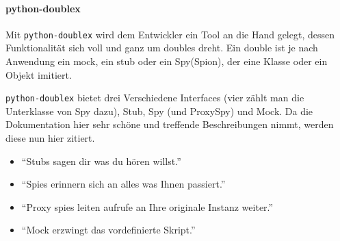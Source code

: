 \paragraph{python-doublex}\label{python-tools:doublex}\mbox{}
\newline
Mit \lstinline{python-doublex} wird dem Entwickler ein Tool an die Hand gelegt,
dessen Funktionalität sich voll und ganz um doubles dreht. Ein double ist je nach
Anwendung ein \Gls{mock}, ein \Gls{stub} oder ein Spy(Spion), der eine Klasse oder
ein Objekt imitiert.

\lstinline{python-doublex} bietet drei Verschiedene Interfaces (vier zählt man die
Unterklasse von Spy dazu), Stub, Spy (und ProxySpy) und Mock. Da die Dokumentation
hier sehr schöne und treffende Beschreibungen nimmt, werden diese nun hier zitiert.
\begin{itemize}
    \item "`Stubs sagen dir was du hören willst."' 
    \item "`Spies erinnern sich an alles was Ihnen passiert."' 
    \item "`Proxy spies leiten aufrufe an Ihre originale Instanz weiter."' 
    \item "`Mock erzwingt das vordefinierte Skript."' 
\end{itemize}